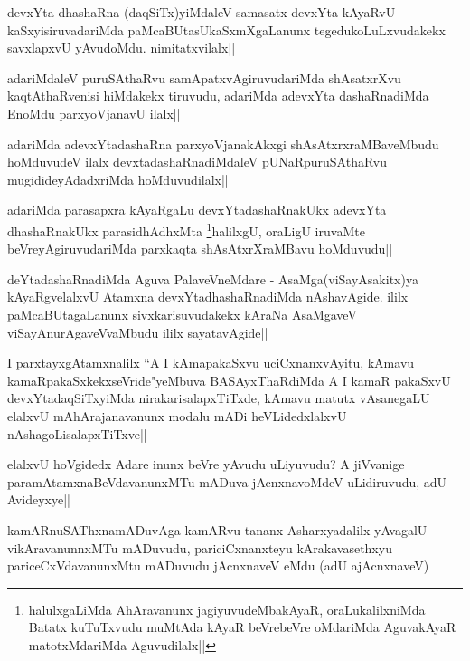 
\begin{artha}
devxYta dhashaRna (daqSiTx)yiMdaleV samasatx devxYta kAyaRvU kaSxyisiruvadariMda paMcaBUtasUkaSxmXgaLanunx tegedukoLuLxvudakekx savxlapxvU yAvudoMdu. nimitatxvilalx||
\end{artha}

\begin{artha}
adariMdaleV puruSAthaRvu samApatxvAgiruvudariMda shAsatxrXvu kaqtAthaRvenisi hiMdakekx tiruvudu, adariMda adevxYta dashaRnadiMda EnoMdu parxyoVjanavU ilalx||
\end{artha}

\begin{artha}
adariMda adevxYtadashaRna parxyoVjanakAkxgi shAsAtxrxraMBaveMbudu hoMduvudeV ilalx devxtadashaRnadiMdaleV pUNaRpuruSAthaRvu mugidideyAdadxriMda hoMduvudilalx||
\end{artha}

\begin{artha}
adariMda parasapxra kAyaRgaLu devxYtadashaRnakUkx adevxYta dhashaRnakUkx parasidhAdhxMta 
\footnote[1]{halulxgaLiMda AhAravanunx jagiyuvudeMbakAyaR, oraLukalilxniMda Batatx kuTuTxvudu muMtAda kAyaR beVrebeVre oMdariMda AguvakAyaR matotxMdariMda Aguvudilalx||}halilxgU, oraLigU iruvaMte beVreyAgiruvudariMda parxkaqta shAsAtxrXraMBavu hoMduvudu||
\end{artha}

\begin{artha}
deYtadashaRnadiMda Aguva PalaveVneMdare - AsaMga(viSayAsakitx)ya kAyaRgvelalxvU Atamxna  devxYtadhashaRnadiMda nAshavAgide. ililx paMcaBUtagaLanunx sivxkarisuvudakekx kAraNa AsaMgaveV viSayAnurAgaveVvaMbudu ililx sayatavAgide||
\end{artha}

\begin{artha}
I parxtayxgAtamxnalilx ``A I kAmapakaSxvu uciCxnanxvAyitu, kAmavu kamaRpakaSxkekxseVride"yeMbuva BASAyxThaRdiMda A I kamaR pakaSxvU devxYtadaqSiTxyiMda nirakarisalapxTiTxde, kAmavu matutx vAsanegaLU elalxvU mAhArajanavanunx modalu mADi heVLidedxlalxvU nAshagoLisalapxTiTxve||
\end{artha}

\begin{artha}
elalxvU hoVgidedx Adare inunx beVre yAvudu uLiyuvudu? A jiVvanige paramAtamxnaBeVdavanunxMTu  mADuva jAcnxnavoMdeV uLidiruvudu, adU Avideyxye||
\end{artha}

\begin{artha}
kamARnuSAThxnamADuvAga kamARvu tananx Asharxyadalilx yAvagalU vikAravanunnxMTu mADuvudu, pariciCxnanxteyu kArakavasethxyu pariceCxVdavanunxMtu mADuvudu jAcnxnaveV eMdu (adU ajAcnxnaveV)
\end{artha}


